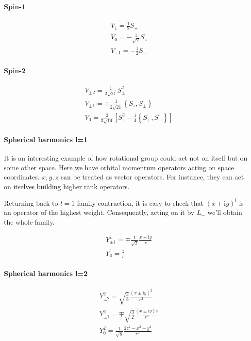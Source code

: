 \paragraph{Spin-1}

\begin{align}
        & V_1 = \frac{1}{2}S_{+} \\
        & V_0 = -\frac{1}{\sqrt{2}} S_{z} \\
        & V_{-1} = -\frac{1}{2}S_{-}
\end{align}

\paragraph{Spin-2}

\begin{align}
        & V_{\pm2} = \frac{1}{2\sqrt{21}} S_{\pm}^2 \\
        & V_{\pm1} = \mp \frac{1}{2\sqrt{21}} \left\{S_z, S_{\pm}\right\} \\
        & V_0 = \frac{2}{3 \sqrt{14}} \left[S_z^2 - \frac{1}{4} \left\{S_{+}, S_{-}\right\} \right]
\end{align}

\paragraph{Spherical harmonics l=1}
It is an interesting example of how rotational group could act not on itself
but on some other space. Here we have orbital momentum operators acting
on space coordinates. ${x, y, z}$ can be treated as vector operators.
For instance, they can act on itselves building higher rank operators.

Returning back to $l=1$ family contruction, it is easy to check that
$(x+\mathrm{i}y)^{l}$ is an operator of the highest weight. Consequently,
acting on it by $L_{-}$ we'll obtain the whole family.

\begin{align}
        & Y_{\pm1}^{1} = \mp \frac{1}{\sqrt{2}} \frac{x \pm \mathrm{i}y}{r} \\
        & Y_0^1 = \frac{z}{r}
\end{align}

\paragraph{Spherical harmonics l=2}
\begin{align}
        &Y_{\pm2}^{2} = \sqrt{\frac{3}{8}} \frac{(x\pm\mathrm{i}y)^2}{r^2} \\
        &Y_{\pm1}^{2} = \mp \sqrt{\frac{3}{2}} \frac{(x\pm\mathrm{i}y)z}{r^2} \\
        &Y_0^{2} = \frac{1}{\sqrt{8}} \frac{2z^2 - x^2 - y^2}{r^2}
\end{align}

